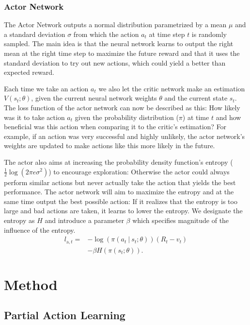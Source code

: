 \documentclass[newfonts=false,format=sigconf,10pt,letterpaper]{acmart}
\newcommand\givenbase[1][]{\:#1\lvert\:}
\let\given\givenbase
\begin{document}
\subsubsection{Actor Network}
\label{subsubsec:genericactor}

The Actor Network outputs a normal distribution parametrized by a mean $\mu$ and a standard deviation $\sigma$ from which the action $a_t$ at time step $t$ is randomly sampled. The main idea is that the neural network learns to output the right mean at the right time step to maximize the future reward and that it uses the standard deviation to try out new actions, which could yield a better than expected reward. 

Each time we take an action $a_t$ we also let the critic network make an estimation $V(s_t; \theta)$, given the current neural network weights $\theta$ and the current state $s_t$. The loss function of the actor network can now be described as this: How likely was it to take action $a_t$ given the probability distribution ($\pi$) at time $t$ and how beneficial was this action when comparing it to the critic's estimation? For example, if an action was very successful and highly unlikely, the actor network's weights are updated to make actions like this more likely in the future. 

The actor also aims at increasing the probability density function's entropy ($\frac{1}{2} \log \left( 2 \pi e \sigma^2 \right)$) to encourage exploration: Otherwise the actor could always perform similar actions but never actually take the action that yields the best performance. The actor network will aim to maximize the entropy and at the same time output the best possible action: If it realizes that the entropy is too large and bad actions are taken, it learns to lower the entropy. We designate the entropy as $H$ and introduce a parameter $\beta$ which specifies magnitude of the influence of the entropy. 
\begin{align}
l_{\text{a},t} =& -\log \left( \pi\left( a_t \given s_t; \theta \right)\right)\left( R_t - v_t \right)\\ 
&- \beta H\left( \pi\left( s_t; \theta \right)\right).
\end{align}

\section{Method}
\subsection{Partial Action Learning}
\label{subsec:pal}
\end{document}
